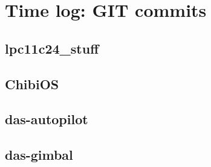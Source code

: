 \appendix
\section{Time log: GIT commits}

\subsection{lpc11c24_stuff}


\subsection{ChibiOS}


\subsection{das-autopilot}


\subsection{das-gimbal}

